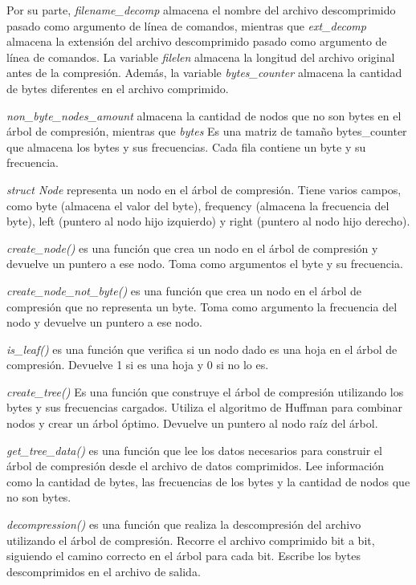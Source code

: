 \documentclass[12pt, article, natbib]{IEEEtran}
\begin{document}
Por su parte, \textit{filename\_decomp} almacena el nombre del archivo descomprimido pasado como argumento de línea de comandos, mientras que \textit {ext\_decomp} almacena la extensión del archivo descomprimido pasado como argumento de línea de comandos. La variable \textit{filelen} almacena la longitud del archivo original antes de la compresión. Además, la variable \textit{bytes\_counter} almacena la cantidad de bytes diferentes en el archivo comprimido.

\textit{non\_byte\_nodes\_amount} almacena la cantidad de nodos que no son bytes en el árbol de compresión, mientras que \textit{bytes} Es una matriz de tamaño bytes\_counter que almacena los bytes y sus frecuencias. Cada fila contiene un byte y su frecuencia.

\textit{struct Node} representa un nodo en el árbol de compresión. Tiene varios campos, como byte (almacena el valor del byte), frequency (almacena la frecuencia del byte), left (puntero al nodo hijo izquierdo) y right (puntero al nodo hijo derecho).

\textit{create\_node()} es una función que crea un nodo en el árbol de compresión y devuelve un puntero a ese nodo. Toma como argumentos el byte y su frecuencia.

\textit{create\_node\_not\_byte()} es una función que crea un nodo en el árbol de compresión que no representa un byte. Toma como argumento la frecuencia del nodo y devuelve un puntero a ese nodo.

\textit{is\_leaf()} es una función que verifica si un nodo dado es una hoja en el árbol de compresión. Devuelve 1 si es una hoja y 0 si no lo es.

\textit{create\_tree()} Es una función que construye el árbol de compresión utilizando los bytes y sus frecuencias cargados. Utiliza el algoritmo de Huffman para combinar nodos y crear un árbol óptimo. Devuelve un puntero al nodo raíz del árbol.

\textit{get\_tree\_data()} es una función que lee los datos necesarios para construir el árbol de compresión desde el archivo de datos comprimidos. Lee información como la cantidad de bytes, las frecuencias de los bytes y la cantidad de nodos que no son bytes.

\textit{decompression()} es una función que realiza la descompresión del archivo utilizando el árbol de compresión. Recorre el archivo comprimido bit a bit, siguiendo el camino correcto en el árbol para cada bit. Escribe los bytes descomprimidos en el archivo de salida.
\end{document}
